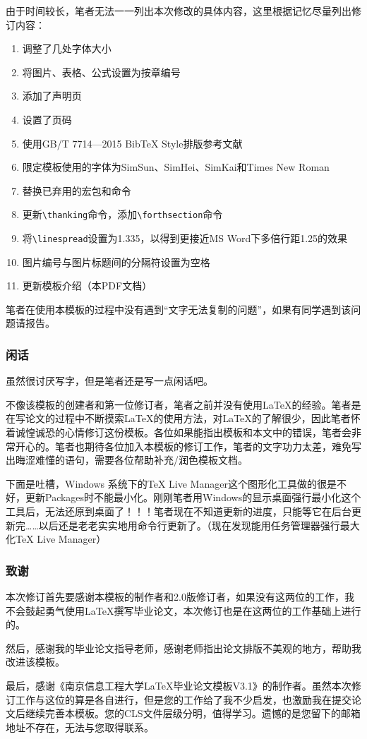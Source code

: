 由于时间较长，笔者无法一一列出本次修改的具体内容，这里根据记忆尽量列出修订内容：
\begin{enumerate}[1、]
    \item 调整了几处字体大小
    \item 将图片、表格、公式设置为按章编号
    \item 添加了声明页
    \item 设置了页码
    \item 使用GB/T 7714—2015 BibTeX Style排版参考文献
    \item 限定模板使用的字体为SimSun、SimHei、SimKai和Times New Roman
    \item 替换已弃用的宏包和命令
    \item 更新\verb|\thanking|命令，添加\verb|\forthsection|命令
    \item 将\verb|\linespread|设置为1.335，以得到更接近MS Word下多倍行距1.25的效果
    \item 图片编号与图片标题间的分隔符设置为空格
    \item 更新模板介绍（本PDF文档）
\end{enumerate}

笔者在使用本模板的过程中没有遇到“文字无法复制的问题”，如果有同学遇到该问题请报告。

\subsubsection*{闲话}

虽然很讨厌写字，但是笔者还是写一点闲话吧。

不像该模板的创建者和第一位修订者，笔者之前并没有使用\LaTeX 的经验。笔者是在写论文的过程中不断摸索\LaTeX 的使用方法，对\LaTeX 的了解很少，因此笔者怀着诚惶诚恐的心情修订这份模板。各位如果能指出模板和本文中的错误，笔者会非常开心的。笔者也期待各位加入本模板的修订工作，笔者的文字功力太差，难免写出晦涩难懂的语句，需要各位帮助补充/润色模板文档。

下面是吐槽，Windows 系统下的TeX Live Manager这个图形化工具做的很是不好，更新Packages时不能最小化。刚刚笔者用Windows的显示桌面强行最小化这个工具后，无法还原到桌面了！！！笔者现在不知道更新的进度，只能等它在后台更新完……以后还是老老实实地用命令行更新了。（现在发现能用任务管理器强行最大化TeX Live Manager）

\subsubsection*{致谢}

本次修订首先要感谢本模板的制作者和2.0版修订者，如果没有这两位的工作，我不会鼓起勇气使用\LaTeX 撰写毕业论文，本次修订也是在这两位的工作基础上进行的。

然后，感谢我的毕业论文指导老师，感谢老师指出论文排版不美观的地方，帮助我改进该模板。

最后，感谢《南京信息工程大学LaTeX毕业论文模板V3.1》的制作者。虽然本次修订工作与这位的算是各自进行，但是您的工作给了我不少启发，也激励我在提交论文后继续完善本模板。您的CLS文件层级分明，值得学习。遗憾的是您留下的邮箱地址不存在，无法与您取得联系。